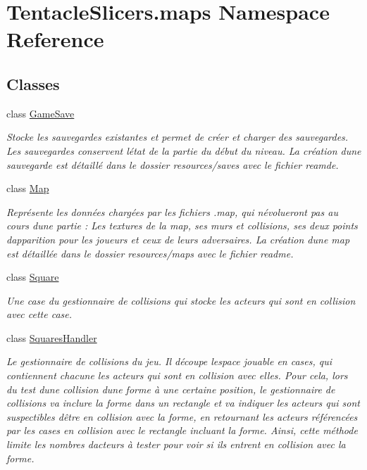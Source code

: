 \hypertarget{namespace_tentacle_slicers_1_1maps}{}\section{Tentacle\+Slicers.\+maps Namespace Reference}
\label{namespace_tentacle_slicers_1_1maps}
\subsection*{Classes}
\begin{DoxyCompactItemize}
\item 
class \hyperlink{class_tentacle_slicers_1_1maps_1_1_game_save}{Game\+Save}
\begin{DoxyCompactList}\small\item\em Stocke les sauvegardes existantes et permet de créer et charger des sauvegardes. Les sauvegardes conservent l\textquotesingle{}état de la partie du début du niveau. La création d\textquotesingle{}une sauvegarde est détaillé dans le dossier resources/saves avec le fichier reamde. \end{DoxyCompactList}\item 
class \hyperlink{class_tentacle_slicers_1_1maps_1_1_map}{Map}
\begin{DoxyCompactList}\small\item\em Représente les données chargées par les fichiers .map, qui n\textquotesingle{}évolueront pas au cours d\textquotesingle{}une partie \+: Les textures de la map, ses murs et collisions, ses deux points d\textquotesingle{}apparition pour les joueurs et ceux de leurs adversaires. La création d\textquotesingle{}une map est détaillée dans le dossier resources/maps avec le fichier readme. \end{DoxyCompactList}\item 
class \hyperlink{class_tentacle_slicers_1_1maps_1_1_square}{Square}
\begin{DoxyCompactList}\small\item\em Une case du gestionnaire de collisions qui stocke les acteurs qui sont en collision avec cette case. \end{DoxyCompactList}\item 
class \hyperlink{class_tentacle_slicers_1_1maps_1_1_squares_handler}{Squares\+Handler}
\begin{DoxyCompactList}\small\item\em Le gestionnaire de collisions du jeu. Il découpe l\textquotesingle{}espace jouable en cases, qui contiennent chacune les acteurs qui sont en collision avec elles. Pour cela, lors du test d\textquotesingle{}une collision d\textquotesingle{}une forme à une certaine position, le gestionnaire de collisions va inclure la forme dans un rectangle et va indiquer les acteurs qui sont suspectibles d\textquotesingle{}être en collision avec la forme, en retournant les acteurs référencées par les cases en collision avec le rectangle incluant la forme. Ainsi, cette méthode limite les nombres d\textquotesingle{}acteurs à tester pour voir si ils entrent en collision avec la forme. \end{DoxyCompactList}\item 

\end{DoxyCompactItemize}
